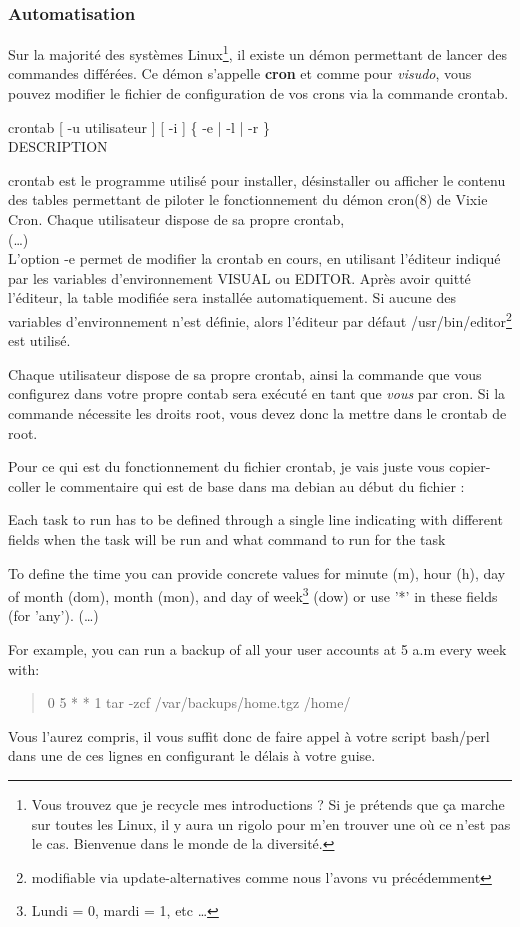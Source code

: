 \documentclass[a4paper,11pt]{article}
\newcommand{\commande}[1] {
    \begin{quote}
    \tt\raggedright #1
    \end{quote}
}
\newcommand{\man}[2]{
    \begin{tcolorbox}[toprule=3mm,width=\textwidth,outer arc=0mm,colbacktitle=grayman,coltitle=black,colback={grayman},colframe={grayman},title={man : \tt #1}]
        \tt\raggedright #2
    \end{tcolorbox}
}
\newcommand{\mandesc}[1]{
    \begin{adjustwidth}{0.8cm}{}
        #1
    \end{adjustwidth}
}
\begin{document}
\subsubsection{Automatisation}
\par Sur la majorité des systèmes Linux\footnote{Vous trouvez que je recycle mes introductions ? Si je prétends que ça marche sur toutes les Linux, il y aura un rigolo pour m'en trouver une où ce n'est pas le cas. Bienvenue dans le monde de la diversité.}, il existe un démon permettant de lancer des commandes différées. Ce démon s'appelle \textbf{cron} et comme pour \emph{visudo}, vous pouvez modifier le fichier de configuration de vos crons via la commande crontab.
\man{crontab}{crontab [ -u utilisateur ] [ -i ] \{ -e | -l | -r \}\\
DESCRIPTION
\mandesc{crontab est le programme utilisé pour installer, désinstaller ou afficher le contenu des tables permettant de piloter le fonctionnement du démon cron(8) de Vixie Cron. Chaque utilisateur dispose de sa propre crontab,\\
(\dots)\\
L'option -e permet de modifier la crontab en cours, en utilisant l'éditeur indiqué par les variables d'environnement VISUAL ou EDITOR. Après avoir quitté l'éditeur, la table modifiée sera installée automatiquement. Si aucune des variables d'environnement n'est définie, alors l'éditeur par défaut /usr/bin/editor\footnote{modifiable via update-alternatives comme nous l'avons vu précédemment} est utilisé.}}
\par Chaque utilisateur dispose de sa propre crontab, ainsi la commande que vous configurez dans votre propre contab sera exécuté en tant que \emph{vous} par cron. Si la commande nécessite les droits root, vous devez donc la mettre dans le crontab de root.
\par Pour ce qui est du fonctionnement du fichier crontab, je vais juste vous copier-coller le commentaire qui est de base dans ma debian au début du fichier :
\par Each task to run has to be defined through a single line indicating with different fields when the task will be run and what command to run for the task
\par To define the time you can provide concrete values for minute (m), hour (h), day of month (dom), month (mon), and day of week\footnote{Lundi = 0, mardi = 1, etc \dots} (dow) or use '*' in these fields (for 'any'). (\dots)
\par For example, you can run a backup of all your user accounts at 5 a.m every week with:
\commande{0 5 * * 1 tar -zcf /var/backups/home.tgz /home/}
\par Vous l'aurez compris, il vous suffit donc de faire appel à votre script bash/perl dans une de ces lignes en configurant le délais à votre guise.
\end{document}
